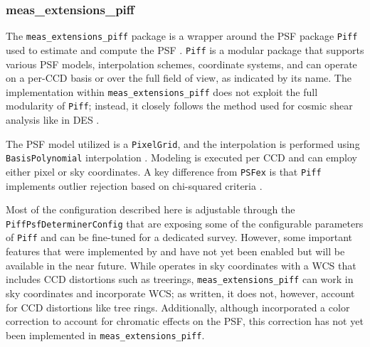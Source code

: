 \subsubsection{meas\_extensions\_piff}\label{sec:meas_extensions_piff}


The \texttt{meas\_extensions\_piff} package is a wrapper around the PSF package \texttt{Piff} used to estimate and compute the PSF \citep{2021ascl.soft02024J,2021MNRAS.501.1282J}.
\texttt{Piff} is a modular package that supports various PSF models, interpolation schemes, coordinate systems, and can operate on
a per-CCD basis or over the full field of view, as indicated by its name.
The implementation within  \texttt{meas\_extensions\_piff} does not exploit the full modularity of \texttt{Piff}; instead, it closely follows the method used for cosmic shear analysis like in DES \citep{2021MNRAS.501.1282J,2025OJAp....8E..26S}.

The PSF model utilized is a \texttt{PixelGrid}, and the interpolation is performed using \texttt{BasisPolynomial} interpolation \citep{2021MNRAS.501.1282J}.
Modeling is executed per CCD and can employ either pixel or sky coordinates.
A key difference from \texttt{PSFex} is that  \texttt{Piff} implements outlier rejection based on chi-squared criteria \citep[see][for more details]{2021MNRAS.501.1282J}.

Most of the configuration described here is adjustable through the \texttt{PiffPsfDeterminerConfig} that are exposing some of the configurable parameters of \texttt{Piff} and can be fine-tuned for a dedicated survey.
However, some important features that were implemented by \citet{2021MNRAS.501.1282J} and \citet{2025OJAp....8E..26S} have not yet been enabled but will be available in the near future.
While \citet{2021MNRAS.501.1282J} operates in sky coordinates with a WCS that includes CCD distortions such as treerings,  \texttt{meas\_extensions\_piff} can work in sky coordinates and incorporate WCS; as written, it does not, however, account for CCD distortions like tree rings.
Additionally, although \citet{2025OJAp....8E..26S} incorporated a color correction to account for chromatic effects on the PSF, this correction has not yet been implemented in  \texttt{meas\_extensions\_piff}.
